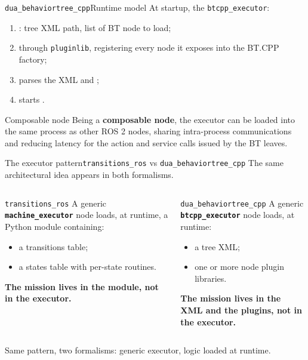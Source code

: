 \begin{frame}{\texttt{dua\_behaviortree\_cpp}}{Runtime model}
  \justifying
  At startup, the \texttt{btcpp\_executor}:
  \begin{enumerate}
    \item {}: tree XML path, list of BT node  to load;
    \item {} through \texttt{pluginlib}, registering every node it exposes into the BT.CPP factory;
    \item parses the XML and ;
    \item starts .
  \end{enumerate}
  \bigskip
  \begin{block}{Composable node}
    \justifying
    Being a \textbf{composable node}, the executor can be loaded into the same process as other ROS 2 nodes, sharing intra-process communications and reducing latency for the action and service calls issued by the BT leaves.
  \end{block}
\end{frame}

\begin{frame}{The executor pattern}{\texttt{transitions\_ros} vs \texttt{dua\_behaviortree\_cpp}}
  \justifying
  The same architectural idea appears in both formalisms.
  \begin{columns}[T]
    \begin{block}{\texttt{transitions\_ros}}
      \justifying
      A generic \textbf{\texttt{machine\_executor}} node loads, at runtime, a Python module containing:
      \begin{itemize}
        \item a transitions table;
        \item a states table with per-state routines.
      \end{itemize}
      \textbf{The mission lives in the module, not in the executor.}
    \end{block}
    \begin{block}{\texttt{dua\_behaviortree\_cpp}}
      \justifying
      A generic \textbf{\texttt{btcpp\_executor}} node loads, at runtime:
      \begin{itemize}
        \item a tree XML;
        \item one or more node plugin libraries.
      \end{itemize}
      \textbf{The mission lives in the XML and the plugins, not in the executor.}
    \end{block}
  \end{columns}
  \bigskip
  \begin{block}{}
    \centering
    Same pattern, two formalisms: generic executor, logic loaded at runtime.
  \end{block}
\end{frame}

